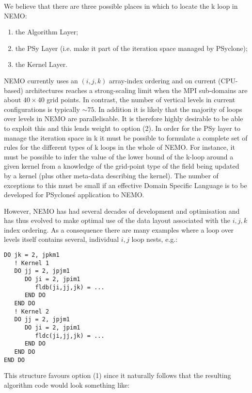 \documentclass{article}
\newcommand{\psyclone}{{PS}yclone}
\begin{document}
We believe that there are three possible places in which to locate the
k loop in NEMO:

\begin{enumerate}

\item the Algorithm Layer;

\item the PSy Layer (i.e. make it part of the iteration space managed
  by \psyclone);

\item the Kernel Layer.

\end{enumerate}

NEMO currently uses an $(i,j,k)$ array-index ordering and on current
(CPU-based) architectures reaches a strong-scaling limit when the MPI
sub-domains are about $40\times 40$ grid points. In contrast, the
number of vertical levels in current configurations is typically
$\sim75$. In addition it is likely that the majority of loops over
levels in NEMO are parallelisable. It is therefore highly desirable to
be able to exploit this and this lends weight to option (2). In order
for the PSy layer to manage the iteration space in k it must be
possible to formulate a complete set of rules for the different types
of k loops in the whole of NEMO. For instance, it must be possible to
infer the value of the lower bound of the k-loop around a given kernel
from a knowledge of the grid-point type of the field being updated by
a kernel (plus other meta-data describing the kernel). The number of
exceptions to this must be small if an effective Domain Specific
Language is to be developed for \psyclone\'s application to NEMO.

However, NEMO has had several decades of development and optimisation
and has thus evolved to make optimal use of the data layout associated
with the $i,j,k$ index ordering. As a consequence there are many
examples where a loop over levels itself contains several, individual
$i,j$ loop nests, e.g.:

\begin{verbatim}
DO jk = 2, jpkm1
   ! Kernel 1
   DO jj = 2, jpjm1
      DO ji = 2, jpim1
         fldb(ji,jj,jk) = ...
      END DO
   END DO
   ! Kernel 2
   DO jj = 2, jpjm1
      DO ji = 2, jpim1
         fldc(ji,jj,jk) = ...
      END DO
   END DO
END DO
\end{verbatim}

This structure favours option (1) since it naturally follows that the
resulting algorithm code would look something like:
\end{document}
